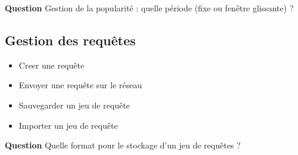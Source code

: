 \documentclass[12pt]{article}
\begin{document}
\textbf{Question } Gestion de la popularité : quelle période (fixe ou fenêtre glissante) ? \newline

\subsection{Gestion des requêtes}

\begin{itemize}
 \item Creer une requête
 \item Envoyer une requête sur le réseau
 \item Sauvegarder un jeu de requête
 \item Importer un jeu de requête
\end{itemize}

\textbf{Question } Quelle format pour le stockage d'un jeu de requêtes ? \newline
\end{document}
